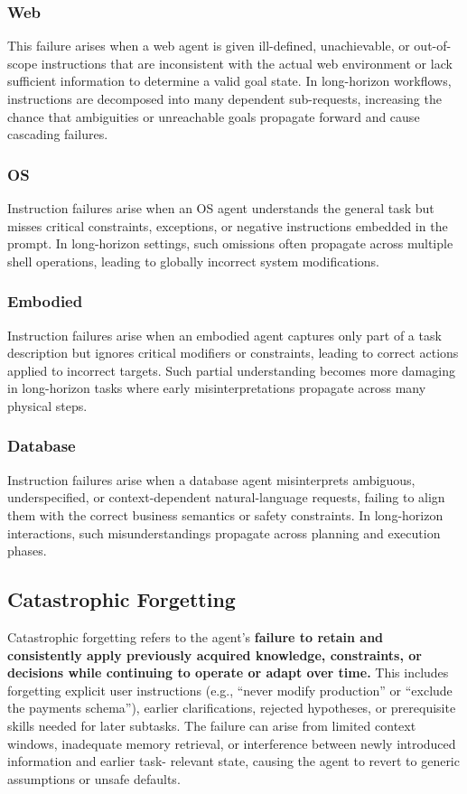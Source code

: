 \documentclass[11pt]{article}
\begin{document}
\subsubsection{Web}
This failure arises when a web agent is given ill-defined, unachievable, or out-of-scope instructions that are inconsistent with the actual web environment or lack sufficient information to determine a valid goal state. In long-horizon workflows, instructions are decomposed into many dependent sub-requests, increasing the chance that ambiguities or unreachable goals propagate forward and cause cascading failures.

\subsubsection{OS}
Instruction failures arise when an OS agent understands the general task but misses critical constraints, exceptions, or negative instructions embedded in the prompt. In long-horizon settings, such omissions often propagate across multiple shell operations, leading to globally incorrect system modifications.

\subsubsection{Embodied} Instruction failures arise when an embodied agent captures only part of a task description but ignores critical modifiers or constraints, leading to correct actions applied to incorrect targets. Such partial understanding becomes more damaging in long-horizon tasks where early misinterpretations propagate across many physical steps.

\subsubsection{Database}
Instruction failures arise when a database agent misinterprets ambiguous, underspecified, or context-dependent natural-language requests, failing to align them with the correct business semantics or safety constraints. In long-horizon interactions, such misunderstandings propagate across planning and execution phases.


\subsection{Catastrophic Forgetting}
Catastrophic forgetting refers to the agent’s \textbf{failure to retain and consistently apply previously
acquired knowledge, constraints, or decisions while continuing to operate or adapt over time.}
This includes forgetting explicit user instructions (e.g., “never modify production” or “exclude
the payments schema”), earlier clarifications, rejected hypotheses, or prerequisite skills
needed for later subtasks. The failure can arise from limited context windows, inadequate
memory retrieval, or interference between newly introduced information and earlier task-
relevant state, causing the agent to revert to generic assumptions or unsafe defaults.
\end{document}
